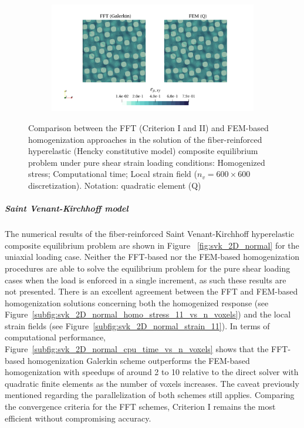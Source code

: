 \begin{figure}[hbt]
\begin{subfigure}[b]{0.49\textwidth}
    \caption{}
    \label{subfig:hencky_2D_shear_cpu_time_vs_n_voxels}
  \end{subfigure}
  \begin{subfigure}[b]{\textwidth}
    \centering
    \includegraphics[width=\textwidth]{figures/hencky_2D_shear_strain_12}
    \caption{}
    \label{subfig:hencky_2D_shear_strain_12}
  \end{subfigure}
  \caption{Comparison between the FFT (Criterion I and II) and FEM-based homogenization approaches in the
  solution of the fiber-reinforced hyperelastic (Hencky constitutive model) composite equilibrium problem under pure
  shear strain loading conditions:
   Homogenized stress;
   Computational time;
   Local strain field (\(n_v = 600 \times 600\)
  discretization). Notation: quadratic element (Q)}
\label{fig:hencky_2D_shear}
\end{figure}

\FloatBarrier

\subparagraph{Saint Venant-Kirchhoff model}

The numerical results of the fiber-reinforced Saint Venant-Kirchhoff hyperelastic composite equilibrium problem are shown in Figure
~\ref{fig:svk_2D_normal} for the uniaxial loading case.
Neither the FFT-based nor the FEM-based homogenization procedures are able to solve the equilibrium problem for the pure shear loading cases when the load is enforced in a single increment, as such these results are not presented.
There is an excellent agreement between the FFT and FEM-based homogenization solutions concerning both the homogenized response (see Figure~\ref{subfig:svk_2D_normal_homo_stress_11_vs_n_voxels}) and the local strain fields (see Figure~\ref{subfig:svk_2D_normal_strain_11}).
In terms of computational performance, Figure~\ref{subfig:svk_2D_normal_cpu_time_vs_n_voxels} shows that the FFT-based homogenization Galerkin scheme outperforms the FEM-based homogenization with speedups of around 2 to 10 relative to the direct solver with quadratic finite elements as the number of voxels increases.
The caveat previously mentioned regarding the parallelization of both schemes still applies.
Comparing the convergence criteria for the FFT schemes, Criterion I remains the most efficient without compromising accuracy.

